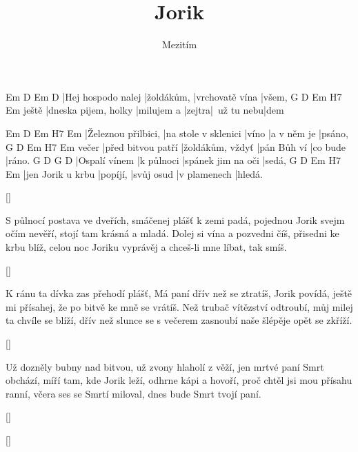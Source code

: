 \documentclass{song}
\author{Mezitím}
\title{Jorik}
\begin{document}
Em                 D          Em              D
|Hej hospodo nalej |žoldákům, |vrchovatě vína |všem,
      G                    D          Em     H7          Em
ještě |dneska pijem, holky |milujem a |zejtra|~už tu nebu|dem
\endstrophe

\strophe
Em                  D                    Em    H7          Em
|Železnou přilbici, |na stole v sklenici |víno |a v něm je |psáno,
      G                  D                Em          H7       Em
večer |před bitvou patří |žoldákům, vždyť |pán Bůh ví |co bude |ráno.
G             D          G                  D
|Ospalí vínem |k půlnoci |spánek jim na oči |sedá,
G                 D        Em         H7           Em
|jen Jorik u krbu |popíjí, |svůj osud |v plamenech |hledá.
\endstrophe

\ref{}

\strophe*
S půlnocí postava ve dveřích, smáčenej plášť k zemi padá,
pojednou Jorik svejm očím nevěří, stojí tam krásná a mladá.
Dolej si vína a pozvedni číš, přisedni ke krbu blíž,
celou noc Joriku vyprávěj a chceš-li mne líbat, tak smíš.
\endstrophe

\ref{}

\strophe*
K ránu ta dívka zas přehodí plášť, Má paní dřív než se ztratíš,
Jorik povídá, ještě mi přísahej, že po bitvě ke mně se vrátíš.
Než trubač vítězství odtroubí, můj milej ta chvíle se blíží,
dřív než slunce se s večerem zasnoubí naše šlépěje opět se zkříží.
\endstrophe

\ref{}

\strophe*
Už dozněly bubny nad bitvou, už zvony hlaholí z věží,
jen mrtvé paní Smrt obchází, míří tam, kde Jorik leží,
odhrne kápi a hovoří, proč chtěl jsi mou přísahu ranní,
včera ses se Smrtí miloval, dnes bude Smrt tvojí paní.
\endstrophe

\ref{}

\ref{}
\end{document}
